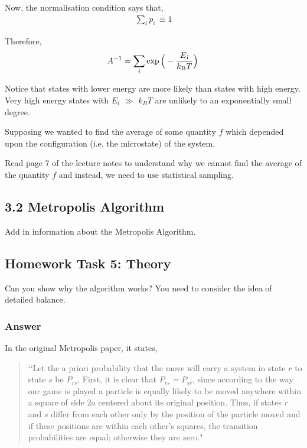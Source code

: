 \documentclass[12pt]{article}
\begin{document}
Now, the normalisation condition says that,
 \begin{align} 
\sum_{i}^{} p_{i}\, \equiv 1
\end{align}

Therefore, 
 \begin{align} 
A^{-1} = \sum_{i}^{} \exp \Big( - \frac{E\textsubscript{i}}{k\textsubscript{B} T}\Big)\,
\end{align}

Notice that states with lower energy are more likely than states with high energy. Very high energy
states with $E_{i}$ \(\gg\) $k_{B}T$ are unlikely to an exponentially small degree.

Supposing we wanted to find the average of some quantity $f$ which depended upon the configuration
(i.e. the microstate) of the system.

Read page 7 of the lecture notes to understand why we cannot find the average of the quantity $f$ and instead, we need to use statistical sampling.

\subsection*{3.2 Metropolis Algorithm}

Add in information about the Metropolis Algorithm.

\subsection*{Homework Task 5: Theory}

Can you show why the algorithm works? You need to consider the idea of detailed balance.

\subsubsection*{Answer}

In the original Metropolis paper, it states,

 \begin{quotation}
‘‘Let the a priori probability that the move will carry a system in state $r$ to state $s$ be $P_{r s}$, 
First, it is clear that $P_{r s} = P_{s r}$, since according to the way our game is played
a particle is equally likely to be moved anywhere within a square of side $2a$ centered about its 
original position. Thus, if states $r$ and $s$ differ from each other only by the position of the particle
 moved and if these positions are within each other's squares, the transition probabilities are equal; 
 otherwise they are zero."
 \end{quotation}
 
\end{document}
